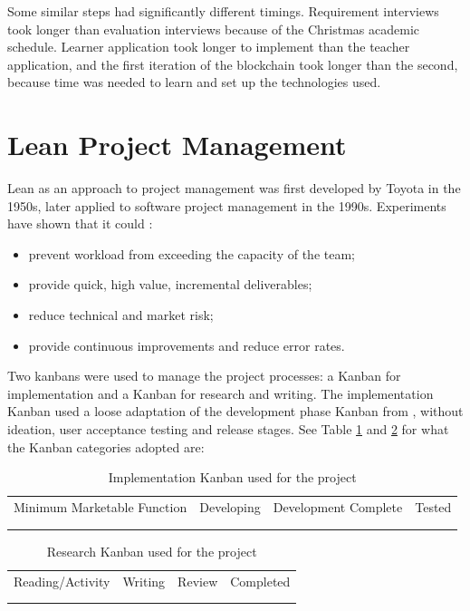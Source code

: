 Some similar steps had significantly different timings. Requirement interviews took longer 
than evaluation interviews because of the Christmas academic schedule. Learner application 
took longer to implement than the teacher application, and the first iteration of the blockchain 
took longer than the second, because time was needed to learn and set up the technologies used.

\section{Lean Project Management}

Lean as an approach to project management was first developed by Toyota in the 1950s, later 
applied to software project management in the 1990s. Experiments have shown that it could \citep[p.30]{middleton2012lean}: 

\begin{itemize}
    \setlength\itemsep{0em}    
    \item prevent workload from exceeding the capacity of the team;
    \item provide quick, high value, incremental deliverables;
    \item reduce technical and market risk;
    \item provide continuous improvements and reduce error rates.
\end{itemize}

Two kanbans were used to manage the project processes: a Kanban for implementation and 
a Kanban for research and writing. The implementation Kanban used
a loose adaptation of the development phase Kanban from \citet[p.25]{middleton2012lean}, 
without ideation, user acceptance testing and release stages.
See Table \ref{table:kanban-implementation} and \ref{table:kanban-research} for what the Kanban categories adopted are:
\\
\begin{table}[!ht] 
    \caption{Implementation Kanban used for the project}
    \centering
    \label{table:kanban-implementation}
    \begin{tabular}{|c|c|c|c|}
        \hline
        Minimum Marketable Function & Developing & Development Complete & Tested \\
        &&&\\
        &&&\\
        \hline
    \end{tabular}
\end{table}
\begin{table}[!ht] 
    \caption{Research Kanban used for the project}
    \centering
    \label{table:kanban-research}
    \begin{tabular}{|c|c|c|c|}
        \hline
        Reading/Activity & Writing & Review & Completed\\
        &&&\\
        &&&\\        
        \hline
    \end{tabular}
\end{table}

